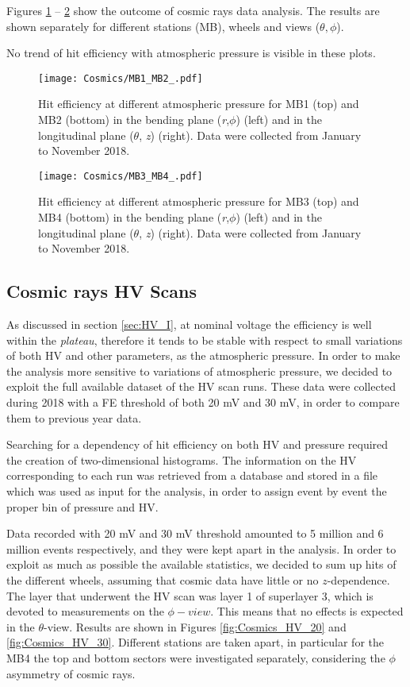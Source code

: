 \documentclass[12pt,twoside,a4paper]{report}
\numberwithin{equation}{section}
\begin{document}
Figures \ref{fig:Cosmics_MB1_MB2} -- \ref{fig:Cosmics_MB3_MB4} show the outcome of cosmic rays data analysis.
The results are shown separately for different stations (MB), wheels and views ($\theta, \phi$).

No trend of hit efficiency with atmospheric pressure is visible in these plots.

\begin{figure}[!htb]
\texttt{[image: Cosmics/MB1\_MB2\_.pdf]}
\caption{\label{fig:Cosmics_MB1_MB2} Hit efficiency at different atmospheric pressure for MB1 (top) and MB2 (bottom) in the bending plane (\textit{r},$ \phi$) (left) and in the longitudinal plane ($\theta$, \textit{z}) (right). Data were collected from January to November 2018.}
\end{figure}

\begin{figure}[!htb]
\texttt{[image: Cosmics/MB3\_MB4\_.pdf]}
\caption{\label{fig:Cosmics_MB3_MB4} Hit efficiency at different atmospheric pressure for MB3 (top) and MB4 (bottom) in the bending plane (\textit{r},$ \phi$) (left) and in the longitudinal plane ($\theta$, \textit{z}) (right). Data were collected from January to November 2018.}
\end{figure}

\subsection{Cosmic rays HV Scans}
As discussed in section \ref{sec:HV_I}, at nominal voltage the efficiency is well within the \textit{plateau}, therefore it tends to be stable with respect to small variations of both HV and other parameters, as the atmospheric pressure.
In order to make the analysis more sensitive to variations of atmospheric pressure, we decided to exploit the full available dataset of the HV scan runs.
These data were collected during 2018 with a FE threshold of both 20 mV and 30 mV, in order to compare them to previous year data.

Searching for a dependency of hit efficiency on both HV and pressure required the creation of two-dimensional histograms.
The information on the HV corresponding to each run was retrieved from a database and stored in a file which was used as input for the analysis, in order to assign event by event the proper bin of pressure and HV.

Data recorded with 20 mV and 30 mV threshold amounted to 5 million and 6 million events respectively, and they were kept apart in the analysis. 
In order to exploit as much as possible the available statistics, we decided to sum up hits of the different wheels, assuming that cosmic data have little or no $z$-dependence.
The layer that underwent the HV scan was layer 1 of superlayer 3, which is devoted to measurements on the $\phi-view$. This means that no effects is expected in the $\theta$-view.
Results are shown in Figures \ref{fig:Cosmics_HV_20} and \ref{fig:Cosmics_HV_30}.
Different stations are taken apart, in particular for the MB4 the top and bottom sectors were investigated separately, considering the $\phi$ asymmetry of cosmic rays. 
\end{document}
